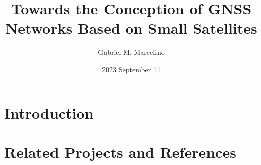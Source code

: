 \documentclass{beamer}
\title[Presentation]{Towards the Conception of GNSS Networks Based on Small Satellites}
\author[SpaceLab]{Gabriel M. Marcelino}
\institute[]{SpaceLab - UFSC}
\date{2023 September 11}
\begin{document}
    
    

    \section{Introduction}

        

    \section{Related Projects and References}

        

\end{document}
